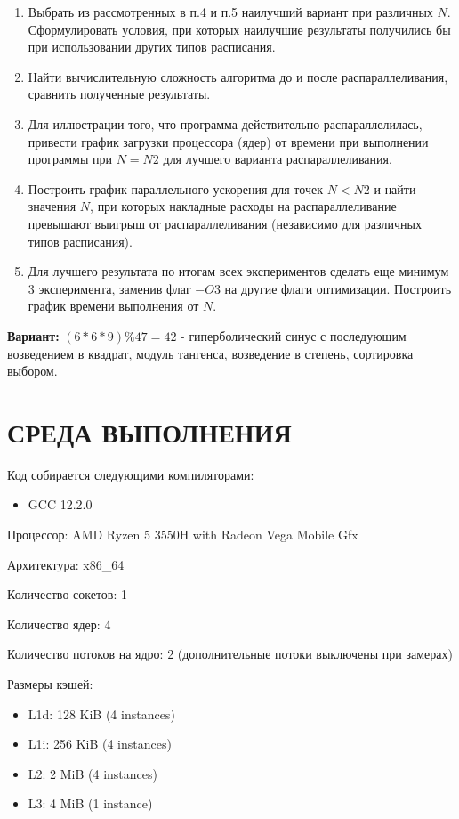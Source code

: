 \documentclass[14pt, a4paper, oneside, final]{extarticle}
\begin{document}
\begin{enumerate}
 \item Выбрать из рассмотренных в п.4 и п.5 наилучший вариант при различных $N$. Сформулировать условия, при которых наилучшие результаты получились бы при использовании других типов расписания.

 \item Найти вычислительную сложность алгоритма до и после распараллеливания, сравнить полученные результаты.

 \item Для иллюстрации того, что программа действительно распараллелилась, привести график загрузки процессора (ядер) от времени при выполнении программы при $N = N2$ для лучшего варианта распараллеливания.

 \item Построить график параллельного ускорения для точек $N < N2$ и найти значения $N$, при которых накладные расходы на распараллеливание превышают выигрыш от распараллеливания (независимо для различных типов расписания).

 \item Для лучшего результата по итогам всех экспериментов сделать еще минимум 3 эксперимента, заменив флаг $-O3$ на другие флаги оптимизации. Построить график времени выполнения от $N$.
\end{enumerate}

\textbf{Вариант:} $(6*6*9) \% 47 = 42$ - гиперболический синус с последующим возведением в квадрат, модуль тангенса, возведение в степень, сортировка выбором.

\clearpage
\section*{СРЕДА ВЫПОЛНЕНИЯ}

Код собирается следующими компиляторами:
\begin{itemize}
 \setlength{\itemindent}{3em}
 \item GCC 12.2.0
\end{itemize}

Процессор: AMD Ryzen 5 3550H with Radeon Vega Mobile Gfx

Архитектура: x86\_64

Количество сокетов: 1

Количество ядер: 4

Количество потоков на ядро: 2 (дополнительные потоки выключены при замерах)

Размеры кэшей:
\begin{itemize}
 \setlength{\itemindent}{3em}
 \item L1d: 128 KiB (4 instances)
 \item L1i: 256 KiB (4 instances)
 \item L2: 2 MiB (4 instances)
 \item L3: 4 MiB (1 instance)
\end{itemize}
\end{document}
